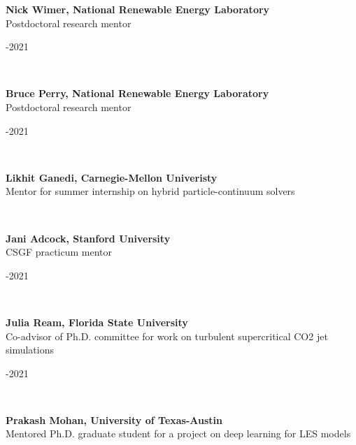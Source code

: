 \documentclass[11pt,letterpaper]{article}
\begin{document}
\begin{minipage}[t]{0.82\textwidth}%
  \textbf{Nick Wimer, National Renewable Energy Laboratory}\\%
  Postdoctoral research mentor%
\end{minipage}\hfill%
\begin{minipage}[t]{0.15\textwidth}-2021%
\end{minipage}\\[2ex]%
\begin{minipage}[t]{0.82\textwidth}%
  \textbf{Bruce Perry, National Renewable Energy Laboratory}\\%
  Postdoctoral research mentor%
\end{minipage}\hfill%
\begin{minipage}[t]{0.15\textwidth}-2021%
\end{minipage}\\[2ex]%
\begin{minipage}[t]{0.82\textwidth}%
  \textbf{Likhit Ganedi, Carnegie-Mellon Univeristy}\\%
  Mentor for summer internship on hybrid particle-continuum solvers%
\end{minipage}\hfill%
\begin{minipage}[t]{0.15\textwidth}%
\end{minipage}\\[2ex]%
\begin{minipage}[t]{0.82\textwidth}%
  \textbf{Jani Adcock, Stanford University}\\%
  CSGF practicum mentor%
\end{minipage}\hfill%
\begin{minipage}[t]{0.15\textwidth}-2021%
\end{minipage}\\[2ex]%
\begin{minipage}[t]{0.82\textwidth}%
  \textbf{Julia Ream, Florida State University}\\%
  Co-advisor of Ph.D. committee for work on turbulent supercritical CO2 jet simulations%
\end{minipage}\hfill%
\begin{minipage}[t]{0.15\textwidth}-2021%
\end{minipage}\\[2ex]%
\begin{minipage}[t]{0.82\textwidth}%
  \textbf{Prakash Mohan, University of Texas-Austin}\\%
  Mentored Ph.D. graduate student for a project on deep learning for LES models%
\end{minipage}\hfill%
\end{document}
